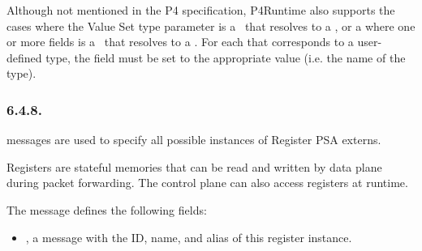 \documentclass[11pt]{article}
\begin{document}
{%
\noindent{}Although not mentioned in the P4 specification, P4Runtime also supports the
cases where the Value Set type parameter is a~ that resolves to a , or a  where
one or more fields is a~ that
resolves to a . For each  that corresponds to a user-defined
type, the  field must be set to the appropriate value (i.e. the name
of the type).%

\subsubsection{6.4.8.\hspace*{0.5em}}\label{sec-register}%

\noindent{} messages are used to specify all possible instances of Register PSA
externs.%

Registers are stateful memories that can be read and written by data plane
during packet forwarding. The control plane can also access registers at
runtime.%

The  message defines the following fields:%

\begin{itemize}%

\item{}
, a  message with the ID, name, and alias of this register
instance.%


\end{itemize}}
\end{document}
